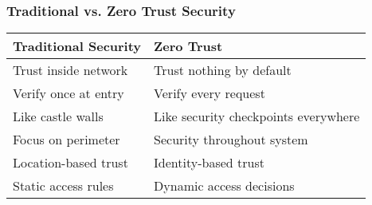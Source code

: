\documentclass{beamer}
\begin{document}
\begin{frame}
    \frametitle{Traditional vs. Zero Trust Security}
    \begin{table}
        \begin{tabular}{|p{}|p{}|}
            \hline
            \textbf{Traditional Security} & \textbf{Zero Trust} \\
            \hline
            Trust inside network & Trust nothing by default \\
            \hline
            Verify once at entry & Verify every request \\
            \hline
            Like castle walls & Like security checkpoints everywhere \\
            \hline
            Focus on perimeter & Security throughout system \\
            \hline
            Location-based trust & Identity-based trust \\
            \hline
            Static access rules & Dynamic access decisions \\
            \hline
        \end{tabular}
    \end{table}
\end{frame}
\end{document}
